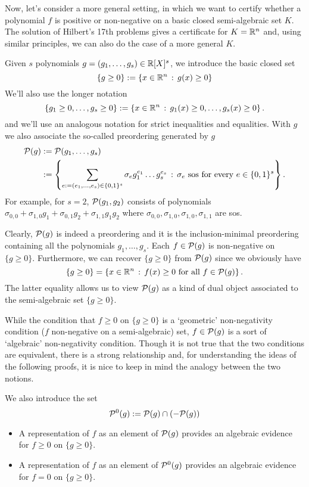 Now, let's consider a more general setting, in which we want to certify whether a polynomial $f$ is positive or non-negative on a basic closed semi-algebraic set $K$. The solution of Hilbert's 17th problems gives a certificate for $K=\mathbb{R}^n$ and, using similar principles, we can also do the case of a more general $K$. 

Given $s$ polynomials $g=(g_1,\ldots,g_s) \in \mathbb{R}[X]^s$, we introduce the basic closed set 
\[
	\{g \ge 0\} := \left\{ x \in \mathbb{R}^n \,:\, g(x) \ge 0 \right\}
\]
We'll also use the longer notation
\[
	\{g_1 \ge 0,\ldots, g_s \ge 0\} := \left\{  x \in\mathbb{R}^n \,:\, g_1(x) \ge 0,\ldots,g_s(x) \ge 0 \right\}.
\]
and we'll use an analogous notation for strict inequalities and equalities. With $g$ we also associate
the so-called preordering generated by $g$
\begin{align*}
	\mathcal{P}(g) & := \mathcal{P}(g_1,\ldots,g_s) 
	\\ & := \left\{ \sum_{e:=(e_1,\ldots,e_s) \in \{0,1\}^s} \sigma_e g_1^{e_1} \ldots g_s^{e_s}  \,:\,  \sigma_e \ \text{sos} \ \text{for every} \ e \in \{0,1\}^s \right\}.
\end{align*}
For example, for $s=2$, $\mathcal{P}(g_1,g_2)$ consists of polynomials $\sigma_{0,0} + \sigma_{1,0} g_1 + \sigma_{0,1} g_2 + \sigma_{1,1} g_1 g_2$ where $\sigma_{0,0}, \sigma_{1,0}, \sigma_{1,0}, \sigma_{1,1}$ are sos. 

Clearly, $\mathcal{P}(g)$ is indeed a preordering and it is the inclusion-minimal preordering containing all the polynomials $g_1,\ldots,g_s$. Each $f \in \mathcal{P}(g)$ is non-negative on $\{g \ge 0\}$. Furthermore, we can recover $\{g \ge 0\}$ from $\mathcal{P}(g)$ since we obviously have 
\[
	\{g \ge 0\} = \left\{ x \in \mathbb{R}^n \,:\, f(x) \ge 0 \ \text{for all} \ f \in \mathcal{P}(g) \right\}.
\]
The latter equality allows us to view $\mathcal{P}(g)$ as a kind of dual object associated to the semi-algebraic set $\{g \ge 0\}$. 

While the condition that $f \ge 0$ on $\{g \ge 0\}$ is a `geometric' non-negativity condition ($f$ non-negative on a semi-algebraic) set, $f \in \mathcal{P}(g)$ is a sort of `algebraic' non-negativity condition. Though it is not true that the two conditions are equivalent, there is a strong relationship and, for understanding the ideas of the following proofs, it is nice to keep in mind the analogy between the two notions. 

We also introduce the set 
\[
	\mathcal{P}^0(g):= \mathcal{P}(g) \cap (-\mathcal{P}(g))
\]

\begin{itemize}
	\item A representation of $f$ as an element of $\mathcal{P}(g)$ provides an algebraic evidence for $f \ge 0$ on $\{g \ge 0\}$. 
	\item A representation of $f$ as an element of $\mathcal{P}^0(g)$ provides an algebraic evidence for $f = 0$ on $\{g \ge 0\}$. 
\end{itemize}


